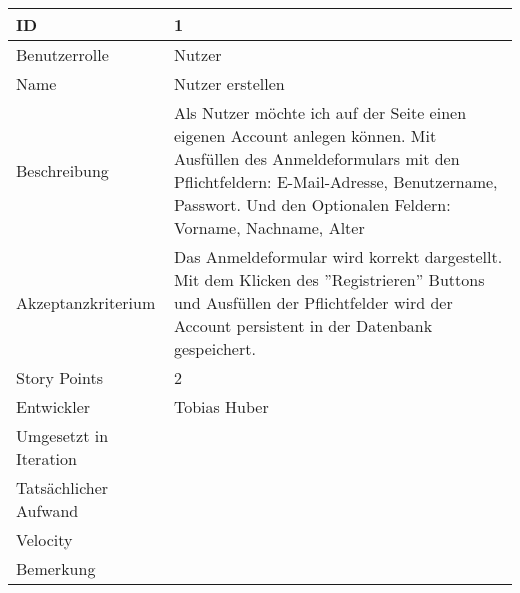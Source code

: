 \begin{tabularx}{\textwidth}{|p{}|X|}
		\hline
		ID & 1 \\
		\hline
		Benutzerrolle & Nutzer \\
		\hline
		Name & Nutzer erstellen \\
		\hline
		Beschreibung & Als Nutzer möchte ich auf der Seite einen eigenen Account anlegen können. Mit Ausfüllen des Anmeldeformulars mit den Pflichtfeldern:
		E-Mail-Adresse,
		Benutzername,
		Passwort.
		Und den Optionalen Feldern:
		Vorname,
		Nachname,
		Alter \\
		\hline
		Akzeptanzkriterium & Das Anmeldeformular wird korrekt dargestellt. Mit dem Klicken des ''Registrieren'' Buttons und Ausfüllen der Pflichtfelder wird der Account persistent in der Datenbank gespeichert. \\
		\hline
		Story Points & 2 \\
		\hline
		Entwickler & Tobias Huber \\
		\hline
		Umgesetzt in Iteration & \\ 
		\hline
		Tatsächlicher Aufwand &  \\
		\hline
		Velocity &  \\
		\hline
		Bemerkung &  \\
		\hline
\end{tabularx}
\vspace{20pt}
